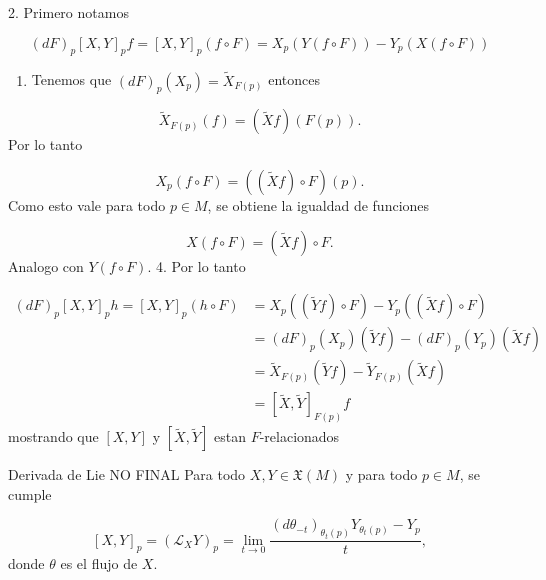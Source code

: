 \begin{bookproof}{}
2. Primero notamos

\[
(dF)_{p}[X,Y]_{p}f=[X,Y]_{p}(f\circ F)=X_{p}(Y(f\circ F))-Y_{p}(X(f\circ F))
\]
\begin{enumerate}[start=3]
\item Tenemos que $(dF)_{p}(X_{p})=\widetilde{X}_{F(p)}$ entonces
\end{enumerate}
\[
\widetilde X_{F(p)}(f)=(\widetilde Xf)(F(p)).
\]
Por lo tanto

\[
X_p(f\circ F)=((\widetilde Xf)\circ F)(p).
\]
Como esto vale para todo $p\in M$, se obtiene la igualdad de funciones

\[
X(f\circ F)=(\widetilde Xf)\circ F.
\]
Analogo con $Y(f\circ F)$. 4. Por lo tanto

\[
\begin{aligned}(dF)_{p}[X,Y]_{p}h=[X,Y]_{p}(h\circ F)&=X_{p}((\widetilde Y f)\circ F)-Y_{p}((\widetilde X f)\circ F)\\&=(dF)_{p}(X_{p})(\widetilde{Y}f)-(dF)_{p}(Y_{p})(\widetilde{X}f)\\&=\widetilde{X}_{F(p)}(\widetilde{Y}f)-\widetilde{Y}_{F(p)}(\widetilde{X}f)\\&=[\widetilde{X},\widetilde{Y}]_{F(p)}f\end{aligned}
\]
mostrando que $[X,Y]$ y $[\widetilde{X},\widetilde{Y}]$ estan $F$-relacionados

\bookqed
\end{bookproof}
\begin{booktheorem}{Derivada de Lie NO FINAL}
Para todo $X,Y\in\mathfrak X(M)$ y para todo $p\in M$, se cumple

\[
[X,Y]_p=(\mathcal L_XY)_p=\lim_{t\to0}\frac{(d\theta_{-t})_{\theta_t(p)}Y_{\theta_t(p)}-Y_p}{t},
\]
donde $\theta$ es el flujo de $X$.

\end{booktheorem}
